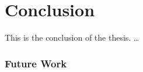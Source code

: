 
\chapter{Conclusion}
\label{ch:Conclusion}
%
This is the conclusion of the thesis.
\dots

\subsection{Future Work}
\label{sec:Conclusion:FutureWork}